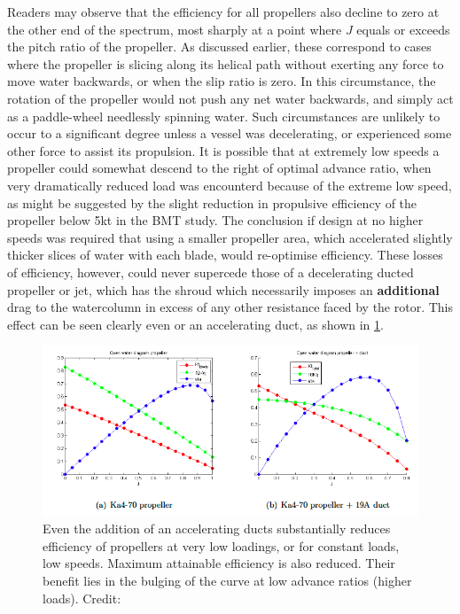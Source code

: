 \documentclass{article}\usepackage[]{graphicx}\usepackage[]{color}
\begin{document}
Readers may observe that the efficiency for all propellers also decline to zero at the other end of the spectrum, most sharply at a point where $J$ equals or exceeds the pitch ratio of the propeller.  As discussed earlier, these correspond to cases where the propeller is slicing along its helical path without exerting any force to move water backwards, or when the slip ratio is zero.  In this circumstance, the rotation of the propeller would not push any net water backwards, and simply act as a paddle-wheel needlessly spinning water.  Such circumstances are unlikely to occur to a significant degree unless a vessel was decelerating, or experienced some other force to assist its propulsion.  It is possible that at extremely low speeds a propeller could somewhat descend to the right of optimal advance ratio, when very dramatically reduced load was encounterd because of the extreme low speed, as might be suggested by the slight reduction in propulsive efficiency of the propeller below 5kt in the BMT study.  The conclusion if design at no higher speeds was required that using a smaller propeller area, which accelerated slightly thicker slices of water with each blade, would re-optimise efficiency.  These losses of efficiency, however, could never supercede those of a decelerating ducted propeller or jet, which has the shroud which necessarily imposes an \textbf{additional} drag to the watercolumn in excess of any other resistance faced by the rotor.  This effect can be seen clearly even or an accelerating duct, as shown in \ref{fig:PropDuct.png}.

\begin{figure}
\includegraphics[width=\textwidth]{PropDuct.png}
\caption{Even the addition of an accelerating ducts substantially reduces efficiency of propellers at very low loadings, or for constant loads, low speeds.  Maximum attainable efficiency is also reduced. Their benefit lies in the bulging of the curve at low advance ratios (higher loads).  Credit: \cite[6]{willemsen2013}}
\label{fig:PropDuct.png}
\end{figure}
\end{document}
